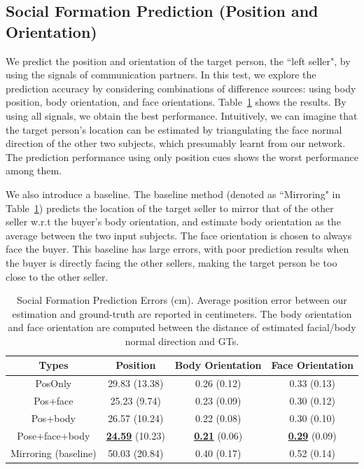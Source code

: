 \subsection{Social Formation Prediction (Position and Orientation)}
We predict the position and orientation of the target person, the ``left seller", by using the signals of communication partners. In this test, we explore the prediction accuracy by considering combinations of difference sources: using body position, body orientation, and face orientations. Table~\ref{table:predForm_errors} shows the results. By using all signals, we obtain the best performance. Intuitively, we can imagine that the target person's location can be estimated by triangulating the face normal direction of the other two subjects, which presumably learnt from our network. The prediction performance using only position cues shows the worst performance among them. 

We also introduce a baseline. The baseline method (denoted as ``Mirroring" in Table~\ref{table:predForm_errors}) predicts the location of the target seller to mirror that of the other seller w.r.t the buyer's body orientation, and estimate body orientation as the average between the two input subjects. The face orientation is chosen to always face the buyer. This baseline has large errors, with poor prediction results when the buyer is directly facing the other sellers, making the target person be too close to the other seller. 



\begin{table}[t]
	\centering
	\begin{tabular}{c| c| c| c}
		\hline
		Types & Position & Body Orientation & Face Orientation\\
		\hline
		PosOnly & 29.83 (13.38) & 0.26 (0.12) & 0.33 (0.13) \\
		\hline
		Pos+face & 25.23 (9.74) & 0.23 (0.09) & 0.30 (0.12) \\
		\hline
		Pos+body & 26.57 (10.24) & 0.22 (0.08) & 0.30 (0.10) \\
		\hline
		Pose+face+body & \underline {\textbf{24.59}} (10.23) &  \underline {\textbf{0.21}} (0.06) &  \underline {\textbf{0.29}} (0.09) \\
		\hline
		Mirroring (baseline) &  50.03 (20.84) & 0.40 (0.17) & 0.52 (0.14) \\
		\hline
	\end{tabular}
	\caption{Social Formation Prediction Errors (cm). Average position error between our estimation and ground-truth are reported in centimeters. The body orientation and face orientation are computed between the distance of estimated facial/body normal direction and GTs.\label{table:predForm_errors}}
\end{table}


